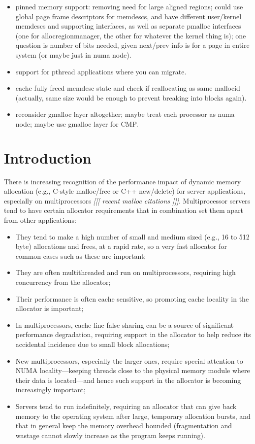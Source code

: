 \documentclass[dvips,11pt]{article}
\newcommand\fixnote[1]{\emph{[[[ #1 ]]]}}
\begin{document}
{{\begin{itemize}
    being safe to access under migration.
  \item pinned memory support: removing need for large aligned regions;
    could use global page frame descriptors for memdescs, and have
    different user/kernel memdescs and supporting interfaces, as well as
    separate pmalloc interfaces (one for allocregionmanager, the other for
    whatever the kernel thing is); one question is number of bits needed,
    given next/prev info is for a page in entire system (or maybe just in
    numa node).
  \item support for pthread applications where you can migrate.
  \item cache fully freed memdesc state and check if reallocating as same
    mallocid (actually, same size would be enough to prevent breaking into
    blocks again).
  \item reconsider gmalloc layer altogether; maybe treat each processor as
    numa node; maybe use gmalloc layer for CMP.
  \end{itemize}
}
}

\section{Introduction}

There is increasing recognition of the performance impact of dynamic memory
allocation (e.g., C-style malloc/free or C++ new/delete) for server
applications, especially on multiprocessors \fixnote{recent malloc
  citations}.  Multiprocessor servers tend to have certain allocator
requirements that in combination set them apart from other applications:
\begin{itemize}
\item They tend to make a high number of small and medium sized (e.g., 16 to
  512 byte) allocations and frees, at a rapid rate, so a very fast
  allocator for common cases such as these are important;
\item They are often multithreaded and run on multiprocessors, requiring
  high concurrency from the allocator;
\item Their performance is often cache sensitive, so promoting cache
  locality in the allocator is important;
\item In multiprocessors, cache line false sharing can be a source of
  significant performance degradation, requiring support in the allocator
  to help reduce its accidental incidence due to small block allocations;
\item New multiprocessors, especially the larger ones, require special
  attention to NUMA locality---keeping threads close to the physical memory 
  module where their data is located---and hence such support in the
  allocator is becoming increasingly important;
\item Servers tend to run indefinitely, requiring an allocator that can
  give back memory to the operating system after large, temporary
  allocation bursts, and that in general keep the memory overhead bounded
  (fragmentation and wastage cannot slowly increase as the program keeps
  running).
\end{itemize}
\end{document}
